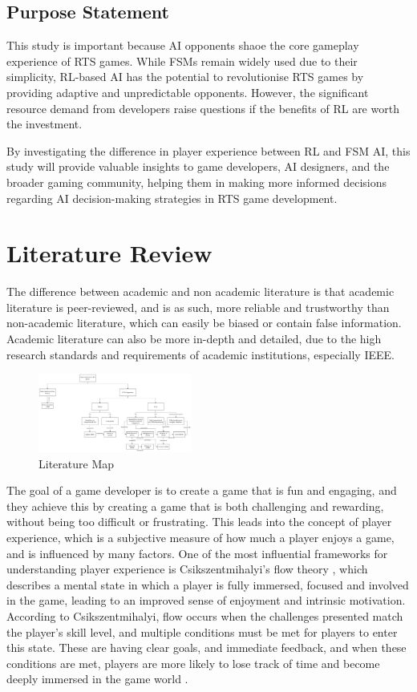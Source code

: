 \documentclass[conference]{IEEEtran}
\begin{document}
\subsection{Purpose Statement}

This study is important because AI opponents shaoe the core gameplay experience of RTS games. While FSMs remain widely used due to their simplicity, RL-based AI has the potential to revolutionise
RTS games by providing adaptive and unpredictable opponents. However, the significant resource demand from developers raise questions if the benefits of RL are worth the investment.

By investigating the difference in player experience between RL and FSM AI, this study will provide valuable insights to game developers, AI designers, and the broader gaming community, helping them
in making more informed decisions regarding AI decision-making strategies in RTS game development.

\section{Literature Review}

The difference between academic and non academic literature is that academic literature is peer-reviewed, and is as such, more reliable and trustworthy
than non-academic literature, which can easily be biased or contain false information. Academic literature can also be more in-depth and detailed, due to
the high research standards and requirements of academic institutions, especially IEEE.

\begin{figure}[htbp]
	\centering
	\includegraphics[width=0.45\textwidth]{Images/Literature_Map.png}
	\caption{Literature Map}
	\label{fig:literature_map}
\end{figure}

The goal of a game developer is to create a game that is fun and engaging, and they achieve this by creating a game that is both challenging and rewarding, without being too difficult or frustrating.
This leads into the concept of player experience, which is a subjective measure of how much a player enjoys a game, and is influenced by many factors. One of the most influential frameworks for understanding player
experience is Csikszentmihalyi's flow theory \cite{csikszentmihalyi_flow_1990}, which describes a mental state in which a player is fully immersed, focused and involved in the game, leading to an improved sense of
enjoyment and intrinsic motivation. According to Csikszentmihalyi, flow occurs when the challenges presented match the player's skill level, and multiple conditions must be met for players to enter this state.
These are having clear goals, and immediate feedback, and when these conditions are met, players are more likely to lose track of time and become deeply immersed in the game world \cite{csikszentmihalyi_flow_1990}.
\end{document}
